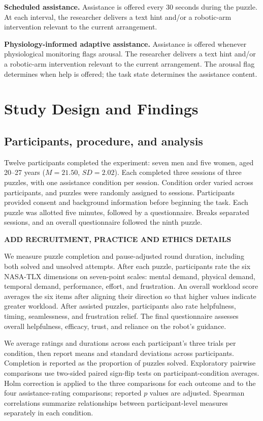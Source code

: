 \documentclass[sigconf]{aamas}
\begin{document}
\textbf{Scheduled assistance.} Assistance is offered every 30 seconds during the puzzle. At each interval, the researcher delivers a text hint and/or a robotic-arm intervention relevant to the current arrangement.

\textbf{Physiology-informed adaptive assistance.} Assistance is offered whenever physiological monitoring flags arousal. The researcher delivers a text hint and/or a robotic-arm intervention relevant to the current arrangement. The arousal flag determines when help is offered; the task state determines the assistance content.

\section{Study Design and Findings}

\subsection{Participants, procedure, and analysis}

Twelve participants completed the experiment: seven men and five women, aged 20--27 years ($M=21.50$, $SD=2.02$). Each completed three sessions of three puzzles, with one assistance condition per session. Condition order varied across participants, and puzzles were randomly assigned to sessions. Participants provided consent and background information before beginning the task. Each puzzle was allotted five minutes, followed by a questionnaire. Breaks separated sessions, and an overall questionnaire followed the ninth puzzle.

\textbf{ADD RECRUITMENT, PRACTICE AND ETHICS DETAILS}

We measure puzzle completion and pause-adjusted round duration, including both solved and unsolved attempts. After each puzzle, participants rate the six NASA-TLX dimensions on seven-point scales: mental demand, physical demand, temporal demand, performance, effort, and frustration. An overall workload score averages the six items after aligning their direction so that higher values indicate greater workload. After assisted puzzles, participants also rate helpfulness, timing, seamlessness, and frustration relief. The final questionnaire assesses overall helpfulness, efficacy, trust, and reliance on the robot's guidance.

We average ratings and durations across each participant's three trials per condition, then report means and standard deviations across participants. Completion is reported as the proportion of puzzles solved. Exploratory pairwise comparisons use two-sided paired sign-flip tests on participant-condition averages. Holm correction is applied to the three comparisons for each outcome and to the four assistance-rating comparisons; reported $p$ values are adjusted. Spearman correlations summarize relationships between participant-level measures separately in each condition.
\end{document}
